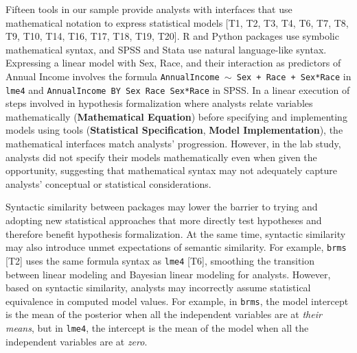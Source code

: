 Fifteen tools in our sample provide analysts with interfaces that use
mathematical notation to express statistical models [T1, T2, T3, T4, T6, T7, T8,
T9, T10, T14, T16, T17, T18, T19, T20]. R and Python packages use symbolic
mathematical syntax, and SPSS and Stata use natural language-like syntax.
Expressing a linear model with Sex, Race, and their interaction as predictors of
Annual Income involves the formula \texttt{AnnualIncome $\sim$ Sex + Race +
Sex*Race} in \texttt{lme4} and \texttt{AnnualIncome BY Sex Race Sex*Race} in
SPSS.  In a linear execution of steps involved in hypothesis formalization where
analysts relate variables mathematically (\textbf{Mathematical Equation}) before
specifying and implementing models using tools (\textbf{Statistical
Specification}, \textbf{Model Implementation}), the mathematical interfaces
match analysts' progression. However, in the lab study, analysts did not specify
their models mathematically even when given the opportunity, suggesting that
mathematical syntax may not adequately capture analysts' conceptual or
statistical considerations. 


Syntactic similarity between packages may lower the barrier to trying and
adopting new statistical approaches that more directly test hypotheses and therefore benefit hypothesis formalization. At the same time, syntactic similarity may also introduce unmet expectations of
semantic similarity. For example, \texttt{brms} [T2] uses the same formula
syntax as \texttt{lme4} [T6], smoothing the transition between linear modeling
and Bayesian linear modeling for analysts. However, based on syntactic
similarity, analysts may incorrectly assume statistical equivalence in computed
model values. For example, in \texttt{brms}, the model intercept is the mean of
the posterior when all the independent variables are at \textit{their means},
but in \texttt{lme4}, the intercept is the mean of the model when all the
independent variables are at \textit{zero}. 


